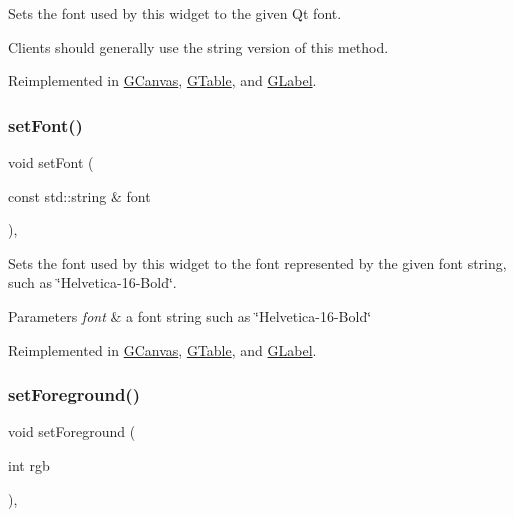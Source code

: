 Sets the font used by this widget to the given Qt font. 

Clients should generally use the string version of this method. 

Reimplemented in \mbox{\hyperlink{classGCanvas_a2d22014c7fa3bccfd58c982aea1b55fa}{G\+Canvas}}, \mbox{\hyperlink{classGTable_a2d22014c7fa3bccfd58c982aea1b55fa}{G\+Table}}, and \mbox{\hyperlink{classGLabel_a2d22014c7fa3bccfd58c982aea1b55fa}{G\+Label}}.

\mbox{\label{classGInteractor_a8e096e8818d838aceae1d46d58fb3a7b}} 
\subsubsection{\texorpdfstring{set\+Font()}{setFont()}\hspace{0.1cm}{\footnotesize\ttfamily [2/2]}}
{\footnotesize\ttfamily void set\+Font (\begin{DoxyParamCaption}\item[{const std\+::string \&}]{font }\end{DoxyParamCaption})\hspace{0.3cm}{\ttfamily [virtual]}, {\ttfamily [inherited]}}



Sets the font used by this widget to the font represented by the given font string, such as \char`\"{}\+Helvetica-\/16-\/\+Bold\char`\"{}. 


\begin{DoxyParams}{Parameters}
{\em font} & a font string such as \char`\"{}\+Helvetica-\/16-\/\+Bold\char`\"{} \\
\hline
\end{DoxyParams}


Reimplemented in \mbox{\hyperlink{classGCanvas_ab39ef411fb13a52852ddd138c5932e2e}{G\+Canvas}}, \mbox{\hyperlink{classGTable_ab39ef411fb13a52852ddd138c5932e2e}{G\+Table}}, and \mbox{\hyperlink{classGLabel_ab39ef411fb13a52852ddd138c5932e2e}{G\+Label}}.

\mbox{\label{classGInteractor_a9eb856b5ff83a19df3831a31f15f4563}} 
\subsubsection{\texorpdfstring{set\+Foreground()}{setForeground()}\hspace{0.1cm}{\footnotesize\ttfamily [1/2]}}
{\footnotesize\ttfamily void set\+Foreground (\begin{DoxyParamCaption}\item[{int}]{rgb }\end{DoxyParamCaption})\hspace{0.3cm}{\ttfamily [virtual]}, {\ttfamily [inherited]}}



